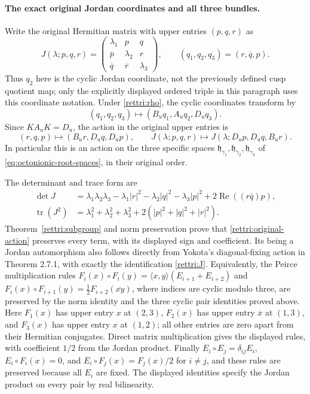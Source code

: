 \documentclass[11pt]{article}
\theoremstyle{definition}
\begin{document}
\paragraph{The exact original Jordan coordinates and all three bundles.}
Write the original Hermitian matrix with upper entries $(p,q,r)$ as
\begin{equation}
 J(\lambda;p,q,r)=
 \begin{pmatrix}
 \lambda_1&p&q\\
 \overline p&\lambda_2&r\\
 \overline q&\overline r&\lambda_3
 \end{pmatrix},\qquad
 (q_1,q_2,q_3)=(r,\overline q,p).
 \label{rettri:J}
\end{equation}
Thus $q_2$ here is the cyclic Jordan coordinate, not the previously
defined cusp quotient map; only the explicitly displayed ordered
triple in this paragraph uses this coordinate notation.
Under \eqref{rettri:rho}, the cyclic coordinates transform by
\[
 (q_1,q_2,q_3)\longmapsto(B_u q_1,A_u q_2,D_u q_3).
\]
Since $K A_u K=D_u$, the action in the original upper entries is
\begin{equation}
 (r,q,p)\longmapsto(B_u r,D_u q,D_u p),\qquad
 J(\lambda;p,q,r)\longmapsto
       J(\lambda;D_u p,D_u q,B_u r).
 \label{rettri:original-action}
\end{equation}
In particular this is an action on the three specific spaces
$\mathfrak h_{\gamma_1},\mathfrak h_{\gamma_2},
\mathfrak h_{\gamma_3}$ of
\eqref{eq:octonionic-root-spaces}, in their original order.

The determinant and trace form are
\begin{align}
 \det J&=\lambda_1\lambda_2\lambda_3
       -\lambda_1|r|^2-\lambda_2|q|^2-\lambda_3|p|^2
       +2\operatorname{Re}((r\overline q)p),
 \label{rettri:det}\\
 \operatorname{tr}(J^2)&=\lambda_1^2+\lambda_2^2+\lambda_3^2
                       +2(|p|^2+|q|^2+|r|^2).
 \label{rettri:metric}
\end{align}
Theorem~\ref{rettri:subgroup} and norm preservation prove that
\eqref{rettri:original-action} preserves every term, with its
displayed sign and coefficient. Its being a Jordan automorphism
also follows directly from Yokota's diagonal-fixing action in
Theorem 2.7.1, with exactly the identification
\eqref{rettri:J}. Equivalently, the Peirce multiplication rules
$F_i(x)\circ F_i(y)=\langle x,y\rangle(E_{i+1}+E_{i+2})$ and
$F_i(x)\circ F_{i+1}(y)=\tfrac12 F_{i+2}(\overline{xy})$,
where indices are cyclic modulo three, are preserved by the norm
identity and the three cyclic pair identities proved above.
Here $F_1(x)$ has upper entry $x$ at $(2,3)$,
$F_2(x)$ has upper entry $\overline x$ at $(1,3)$, and
$F_3(x)$ has upper entry $x$ at $(1,2)$; all other entries are
zero apart from their Hermitian conjugates. Direct matrix
multiplication gives the displayed rules, with coefficient
$1/2$ from the Jordan product. Finally
$E_i\circ E_j=\delta_{ij}E_i$, $E_i\circ F_i(x)=0$,
and $E_i\circ F_j(x)=F_j(x)/2$ for $i\ne j$, and these rules
are preserved because all $E_i$ are fixed. The displayed
identities specify the Jordan product on every pair by real
bilinearity.
\end{document}
